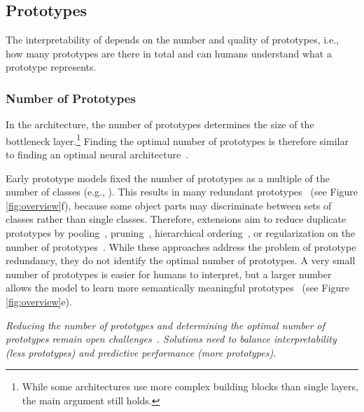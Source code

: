 \subsection{\texorpdfstring{\colorbox[RGB]{0, 191, 192}{Prototypes}}{Prototypes}}
\label{ssec:chall:proto}
The interpretability of \ppms depends on the number and quality of prototypes, i.e., how many prototypes are there in total and can humans understand what a prototype represents. 

\subsubsection{\texorpdfstring{\colorbox[RGB]{128, 223, 223}{Number}}{Number} of Prototypes}
\label{sssec:chall:proto:number}
In the \ppm architecture, the number of prototypes determines the size of the bottleneck layer.\footnote{While some architectures use more complex building blocks than single layers, the main argument still holds.} Finding the optimal number of prototypes is therefore similar to finding an optimal neural architecture~\cite{Elsken2019_survey-neural-arch-search}.

Early prototype models fixed the number of prototypes as a multiple of the number of classes (e.g., \citealt{Chen_2019_ThisLooksThat,Li_2024_ImprovingPrototypicalVisual}). This results in many redundant prototypes~\citep{Davoodi_2023_interpretabilitypartprototypebased} (see Figure \ref{fig:overview}f), because some object parts may discriminate between sets of classes rather than single classes. 
Therefore, extensions aim to reduce duplicate prototypes by pooling~\citep{Rymarczyk_2022_InterpretableImageClassification}, pruning~\citep{Rymarczyk_2021_ProtoPSharePrototypicalParts}, hierarchical ordering~\citep{Nauta_2021_NeuralPrototypeTrees}, or regularization on the number of prototypes~\citep{Nauta_2023_PIPNetPatchBasedIntuitive}.
While these approaches address the problem of prototype redundancy, they do not identify the optimal number of prototypes. A very small number of prototypes is easier for humans to interpret, but a larger number allows the model to learn more semantically meaningful prototypes~\cite{Davoodi_2023_interpretabilitypartprototypebased} (see Figure \ref{fig:overview}e).

\textit{
Reducing the number of prototypes and determining the optimal number of prototypes remain open challenges~\cite{Song_2024_MorphologicalPrototypingUnsupervised}. Solutions need to balance interpretability (less prototypes) and predictive performance (more prototypes)}.

